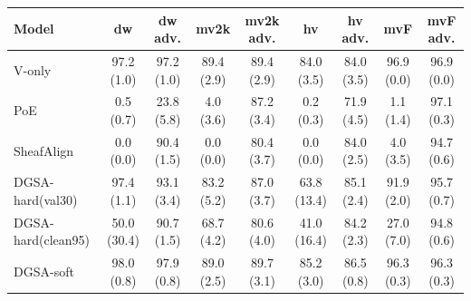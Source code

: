 \small
\begin{tabular}{lcccccccc}
\toprule
Model & dw & dw adv. & mv2k & mv2k adv. & hv & hv adv. & mvF & mvF adv. \\
\midrule
V-only & 97.2 (1.0) & 97.2 (1.0) & 89.4 (2.9) & 89.4 (2.9) & 84.0 (3.5) & 84.0 (3.5) & 96.9 (0.0) & 96.9 (0.0) \\
PoE & 0.5 (0.7) & 23.8 (5.8) & 4.0 (3.6) & 87.2 (3.4) & 0.2 (0.3) & 71.9 (4.5) & 1.1 (1.4) & 97.1 (0.3) \\
SheafAlign & 0.0 (0.0) & 90.4 (1.5) & 0.0 (0.0) & 80.4 (3.7) & 0.0 (0.0) & 84.0 (2.5) & 4.0 (3.5) & 94.7 (0.6) \\
DGSA-hard(val30) & 97.4 (1.1) & 93.1 (3.4) & 83.2 (5.2) & 87.0 (3.7) & 63.8 (13.4) & 85.1 (2.4) & 91.9 (2.0) & 95.7 (0.7) \\
DGSA-hard(clean95) & 50.0 (30.4) & 90.7 (1.5) & 68.7 (4.2) & 80.6 (4.0) & 41.0 (16.4) & 84.2 (2.3) & 27.0 (7.0) & 94.8 (0.6) \\
DGSA-soft & 98.0 (0.8) & 97.9 (0.8) & 89.0 (2.5) & 89.7 (3.1) & 85.2 (3.0) & 86.5 (0.8) & 96.3 (0.3) & 96.3 (0.3) \\
\bottomrule
\end{tabular}

